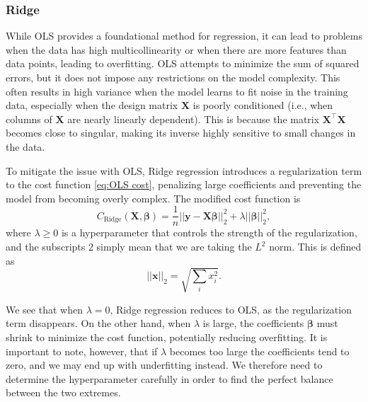 \documentclass[aps,pra,english,notitlepage,reprint,nofootinbib]{revtex4-1}  %
\begin{document}
\subsubsection{Ridge}\label{subsubsec:ridge} 
While OLS provides a foundational method for regression, it can lead to problems when the data has high multicollinearity or when there are more features than data points, leading to overfitting. OLS attempts to minimize the sum of squared errors, but it does not impose any restrictions on the model complexity. This often results in high variance when the model learns to fit noise in the training data, especially when the design matrix $\mathbf{X}$ is poorly conditioned (i.e., when columns of $\mathbf{X}$ are nearly linearly dependent). This is because the matrix $\mathbf{X}^\top \mathbf{X}$ becomes close to singular, making its inverse highly sensitive to small changes in the data. 

To mitigate the issue with OLS, Ridge regression introduces a regularization term to the cost function \eqref{eq:OLS cost}, penalizing large coefficients and preventing the model from becoming overly complex. The modified cost function is
\begin{equation}
  C_{\text{Ridge}}(\mathbf{X},\boldsymbol{\beta}) = \frac{1}{n}\left|\left|\mathbf{y}-\mathbf{X}\boldsymbol{\beta} \right|\right|_2^2 + \lambda \left|\left|\boldsymbol{\beta}\right|\right|_2^2,
\end{equation}
where $\lambda \geq 0$ is a hyperparameter that controls the strength of the regularization, and the subscripts 2 simply mean that we are taking the $L^2$ norm. This is defined as
\begin{equation*}
  \left|\left|\mathbf{x}\right|\right|_2 = \sqrt{\sum_ix_i^2}.
\end{equation*}

We see that when $\lambda = 0$, Ridge regression reduces to OLS, as the regularization term disappears. On the other hand, when $\lambda$ is large, the coefficients $\boldsymbol{\beta}$ must shrink to minimize the cost function, potentially reducing overfitting. It is important to note, however, that if $\lambda$ becomes too large the coefficients tend to zero, and we may end up with underfitting instead. We therefore need to determine the hyperparameter carefully in order to find the perfect balance between the two extremes. 
\end{document}

